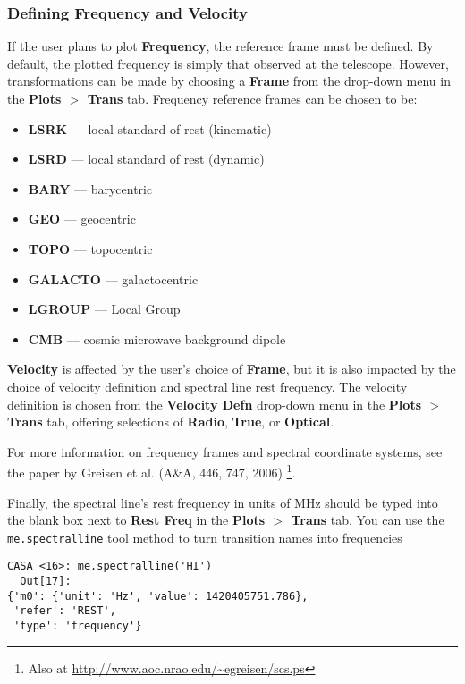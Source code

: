 
\subsubsection{Defining Frequency and Velocity}
\label{section:edit.plot.plotms.trans}

If the user plans to plot {\bf Frequency}, the reference frame must be defined. By default, the plotted frequency is simply that observed at the telescope. However, transformations can be made by choosing a {\bf Frame} from the drop-down menu in the {\bf Plots $>$ Trans} tab. Frequency reference frames can be chosen to be:
\begin{itemize}
\item {\bf LSRK} --- local standard of rest (kinematic)
\item {\bf LSRD} --- local standard of rest (dynamic)
\item {\bf BARY} --- barycentric
\item {\bf GEO} --- geocentric
\item {\bf TOPO} --- topocentric
\item {\bf GALACTO} --- galactocentric
\item {\bf LGROUP} --- Local Group
\item {\bf CMB} --- cosmic microwave background dipole
\end{itemize}

{\bf Velocity} is affected by the user's choice of {\bf Frame}, but it is also impacted by the choice of velocity definition and spectral line rest frequency. The velocity definition is chosen from the {\bf Velocity Defn} drop-down menu in the {\bf Plots $>$ Trans} tab, offering selections of {\bf Radio}, {\bf True}, or {\bf Optical}. 

For more information on frequency frames and spectral coordinate systems, see the paper by Greisen et al. (A\&A, 446, 747, 2006) \footnote{Also at \url{http://www.aoc.nrao.edu/~egreisen/scs.ps}}.

Finally, the spectral line's rest frequency in units of MHz should be typed into the blank box next to {\bf Rest Freq} in the {\bf Plots $>$ Trans} tab. You can use the {\tt me.spectralline} tool method to turn transition names into frequencies 
\small
\begin{verbatim}
CASA <16>: me.spectralline('HI')
  Out[17]: 
{'m0': {'unit': 'Hz', 'value': 1420405751.786},
 'refer': 'REST',
 'type': 'frequency'}
\end{verbatim}
\normalsize

